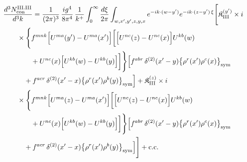 \begingroup\small
\begin{align}\label{eq:H-III.III-2}
&\frac{d^{3}N^{\rm III.III}_{{\rm con}}}{d^{3}k}=\frac{1}{(2\pi)^{3}}\, \frac{ig^{4}}{8\pi^{4}}\, \frac{1}{k^{+}} \int_{0}^{\infty}\frac{d\xi}{2\pi} \int_{w,x',y',z,y,x}e^{-ik\cdot(w-y')}e^{-ik\cdot(z-y')\,\xi}\Bigg[ \mathfrak{K}^{(y')}_{\rm III} \times i\notag\\
&\quad\quad \times \Bigg\{f^{mnk}\Big[U^{ma}(y')-U^{ma}(x')\Big]\bigg[\Big[U^{nc}(z)-U^{nc}(x)\Big]U^{kb}(w)\notag\\
&\quad\quad\quad\quad +U^{nc}(x)\Big[U^{kb}(w)-U^{kb}(y)\Big]\bigg] \Bigg\} \Big[f^{abr}\, \delta^{(2)}(x'-y)\big\{\rho^{r}(x')\rho^{c}(x)\big\}_{\rm sym}\notag\\
&\quad\quad\quad +f^{acr}\, \delta^{(2)}(x'-x)\big\{\rho^{r}(x')\rho^{b}(y)\big\}_{\rm sym}\Big] + \mathfrak{K}^{(z)}_{\rm III} \times i\notag\\
&\quad\quad \times \Bigg\{f^{mnk}\Big[U^{ma}(z)-U^{ma}(x')\Big]\bigg[\Big[U^{nc}(z)-U^{nc}(x)\Big]U^{kb}(w)\notag\\
&\quad\quad\quad\quad +U^{nc}(x)\Big[U^{kb}(w)-U^{kb}(y)\Big]\bigg] \Bigg\} \Big[f^{abr}\, \delta^{(2)}(x'-y)\big\{\rho^{r}(x')\rho^{c}(x)\big\}_{\rm sym}\notag\\
&\quad\quad\quad +f^{acr}\, \delta^{(2)}(x'-x)\big\{\rho^{r}(x')\rho^{b}(y)\big\}_{\rm sym}\Big]\Bigg] +{\rm c.c.}
\end{align}
\endgroup
